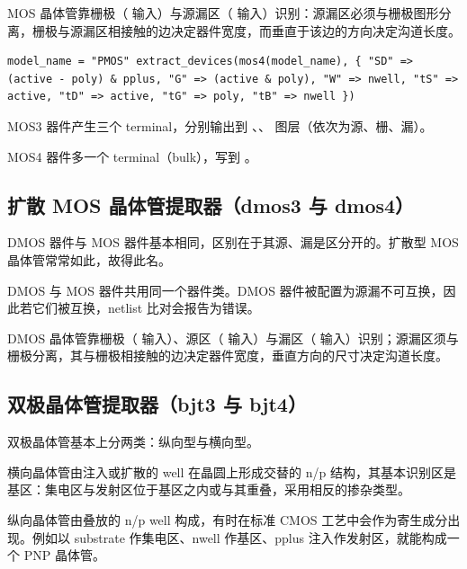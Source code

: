 MOS 晶体管靠栅极（ 输入）与源漏区（ 输入）识别：源漏区必须与栅极图形分离，栅极与源漏区相接触的边决定器件宽度，而垂直于该边的方向决定沟道长度。


\begin{lstlisting}
model_name = "PMOS" extract_devices(mos4(model_name), { "SD" => (active - poly) & pplus, "G" => (active & poly), "W" => nwell, "tS" => active, "tD" => active, "tG" => poly, "tB" => nwell })
\end{lstlisting}

MOS3 器件产生三个 terminal，分别输出到 、、 图层（依次为源、栅、漏）。


MOS4 器件多一个 terminal（bulk），写到 。


\subsection{扩散 MOS 晶体管提取器（dmos3 与 dmos4）}

DMOS 器件与 MOS 器件基本相同，区别在于其源、漏是区分开的。扩散型 MOS 晶体管常常如此，故得此名。

DMOS 与 MOS 器件共用同一个器件类。DMOS 器件被配置为源漏不可互换，因此若它们被互换，netlist 比对会报告为错误。

DMOS 晶体管靠栅极（ 输入）、源区（ 输入）与漏区（ 输入）识别；源漏区须与栅极分离，其与栅极相接触的边决定器件宽度，垂直方向的尺寸决定沟道长度。

\subsection{双极晶体管提取器（bjt3 与 bjt4）}

双极晶体管基本上分两类：纵向型与横向型。

横向晶体管由注入或扩散的 well 在晶圆上形成交替的 n/p 结构，其基本识别区是基区：集电区与发射区位于基区之内或与其重叠，采用相反的掺杂类型。


纵向晶体管由叠放的 n/p well 构成，有时在标准 CMOS 工艺中会作为寄生成分出现。例如以 substrate 作集电区、nwell 作基区、pplus 注入作发射区，就能构成一个 PNP 晶体管。


